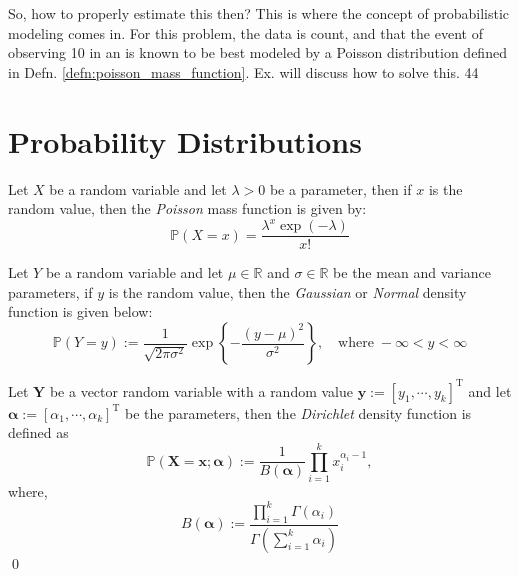 \begin{exmpx}
So, how to properly estimate this then? This is where the concept of probabilistic modeling comes in. For this problem, the data is count, and that the event of observing 10   in an  is known to be best modeled by a Poisson distribution defined in Defn. \ref{defn:poisson_mass_function}. Ex. will discuss how to solve this.   44 
\end{exmpx}
\section{Probability Distributions}
\begin{defnx}\label{defn:poisson_mass_function}
Let $X$ be a random variable and let $\lambda>0$ be a parameter, then if $x$ is the random value, then the \textit{Poisson} mass function is given by:
\begin{equation}
    \mathbb{P}(X=x)=\frac{\lambda^x\exp(-\lambda)}{x!}
\end{equation}
\end{defnx}
\begin{defnx}
Let $Y$ be a random variable and let $\mu\in\mathbb{R}$ and $\sigma\in\mathbb{R}$ be the mean and variance parameters, if $y$ is the random value, then the \textit{Gaussian} or \textit{Normal} density function is given below:
\begin{equation}
    \mathbb{P}(Y=y):=\frac{1}{\sqrt{2\pi\sigma^2}}\exp\left\{-\frac{(y-\mu)^2}{\sigma^2}\right\},\quad\text{where}\;-\infty<y<\infty
\end{equation}
\end{defnx}
\begin{defnx}
Let $\mathbf{Y}$ be a vector random variable with a random value $\mathbf{y}:=[y_1,\cdots,y_k]^{\text{T}}$ and let $\boldsymbol{\alpha}:=[\alpha_1,\cdots,\alpha_k]^{\text{T}}$ be the parameters, then the \textit{Dirichlet} density function is defined as
\begin{equation}
    \mathbb{P}(\mathbf{X}=\mathbf{x};\boldsymbol{\alpha}):=\frac{1}{B(\boldsymbol{\alpha})}\prod_{i=1}^kx_i^{\alpha_i-1},
\end{equation}
where,
\begin{equation}
    B(\boldsymbol{\alpha}):=\frac{\displaystyle\prod_{i=1}^k\Gamma(\alpha_i)}{\Gamma\left(\sum_{i=1}^k\alpha_i\right)}
\end{equation}
\qed
\end{defnx}
